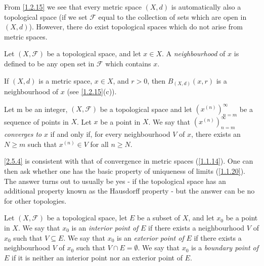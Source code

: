 \begin{note}
  From \cref{1.2.15} we see that every metric space \((X, d)\) is automatically also a topological space
  (if we set \(\mathcal{F}\) equal to the collection of sets which are open in \((X, d)\)).
  However, there do exist topological spaces which do not arise from metric spaces.
\end{note}

\begin{definition}[Neighbourhoods]\label{2.5.2}
  Let \((X, \mathcal{F})\) be a topological space, and let \(x \in X\).
  A \emph{neighbourhood} of \(x\) is defined to be any open set in \(\mathcal{F}\) which contains \(x\).
\end{definition}

\begin{example}\label{2.5.3}
  If \((X, d)\) is a metric space, \(x \in X\), and \(r > 0\), then \(B_{(X, d)}(x, r)\) is a neighbourhood of \(x\) (see \cref{1.2.15}(c)).
\end{example}

\begin{definition}\label{2.5.4}
  Let m be an integer, \((X, \mathcal{F})\) be a topological space and let \((x^{(n)})_{n = m}^\infty\) be a sequence of points in \(X\).
  Let \(x\) be a point in \(X\).
  We say that \((x^{(n)})_{n = m}^\infty\) \emph{converges to} \(x\) if and only if, for every neighbourhood \(V\) of \(x\), there exists an \(N \geq m\) such that \(x^{(n)} \in V\) for all \(n \geq N\).
\end{definition}

\begin{note}
  \cref{2.5.4} is consistent with that of convergence in metric spaces (\cref{1.1.14}).
  One can then ask whether one has the basic property of uniqueness of limits (\cref{1.1.20}).
  The answer turns out to usually be yes
  - if the topological space has an additional property known as the Hausdorff property
  - but the answer can be no for other topologies.
\end{note}

\begin{definition}\label{2.5.5}
  Let \((X, \mathcal{F})\) be a topological space, let \(E\) be a subset of \(X\), and let \(x_0\) be a point in \(X\).
  We say that \(x_0\) is an \emph{interior point of} \(E\) if there exists a neighbourhood \(V\) of \(x_0\) such that \(V \subseteq E\).
  We say that \(x_0\) is an \emph{exterior point of} \(E\) if there exists a neighbourhood \(V\) of \(x_0\) such that \(V \cap E = \emptyset\).
  We say that \(x_0\) is a \emph{boundary point of} \(E\) if it is neither an interior point nor an exterior point of \(E\).
\end{definition}

